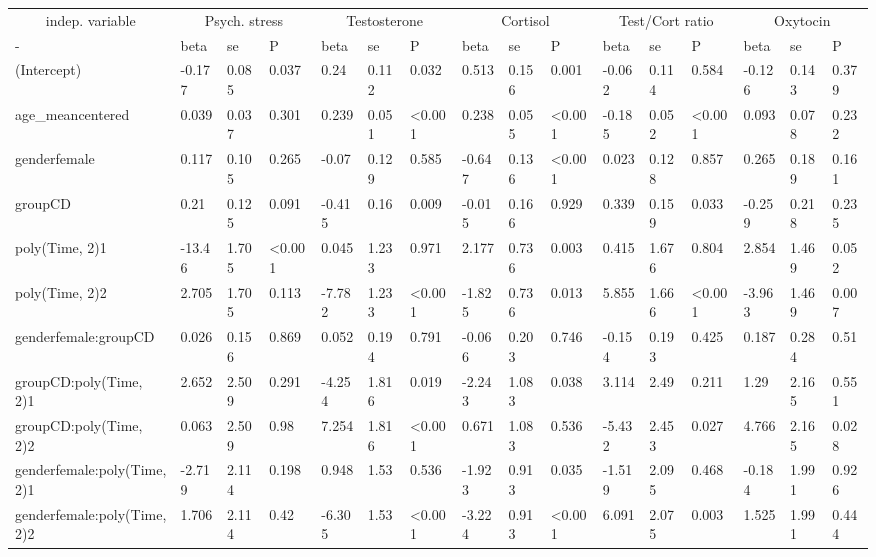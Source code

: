 \documentclass[
]{article}
\begin{document}
\begin{table}
\centering
\begin{tabular}[t]{l|l|l|l|l|l|l|l|l|l|l|l|l|l|l|l}
\hline
\multicolumn{1}{c|}{indep. variable} & \multicolumn{3}{c|}{Psych. stress} & \multicolumn{3}{c|}{Testosterone} & \multicolumn{3}{c|}{Cortisol} & \multicolumn{3}{c|}{Test/Cort ratio} & \multicolumn{3}{c}{Oxytocin} \\
\cline{1-1} \cline{2-4} \cline{5-7} \cline{8-10} \cline{11-13} \cline{14-16}
- & beta & se & P & beta & se & P & beta & se & P & beta & se & P & beta & se & P\\
\hline
(Intercept) & -0.177 & 0.085 & 0.037 & 0.24 & 0.112 & 0.032 & 0.513 & 0.156 & 0.001 & -0.062 & 0.114 & 0.584 & -0.126 & 0.143 & 0.379\\
\hline
age\_meancentered & 0.039 & 0.037 & 0.301 & 0.239 & 0.051 & <0.001 & 0.238 & 0.055 & <0.001 & -0.185 & 0.052 & <0.001 & 0.093 & 0.078 & 0.232\\
\hline
genderfemale & 0.117 & 0.105 & 0.265 & -0.07 & 0.129 & 0.585 & -0.647 & 0.136 & <0.001 & 0.023 & 0.128 & 0.857 & 0.265 & 0.189 & 0.161\\
\hline
groupCD & 0.21 & 0.125 & 0.091 & -0.415 & 0.16 & 0.009 & -0.015 & 0.166 & 0.929 & 0.339 & 0.159 & 0.033 & -0.259 & 0.218 & 0.235\\
\hline
poly(Time, 2)1 & -13.46 & 1.705 & <0.001 & 0.045 & 1.233 & 0.971 & 2.177 & 0.736 & 0.003 & 0.415 & 1.676 & 0.804 & 2.854 & 1.469 & 0.052\\
\hline
poly(Time, 2)2 & 2.705 & 1.705 & 0.113 & -7.782 & 1.233 & <0.001 & -1.825 & 0.736 & 0.013 & 5.855 & 1.666 & <0.001 & -3.963 & 1.469 & 0.007\\
\hline
genderfemale:groupCD & 0.026 & 0.156 & 0.869 & 0.052 & 0.194 & 0.791 & -0.066 & 0.203 & 0.746 & -0.154 & 0.193 & 0.425 & 0.187 & 0.284 & 0.51\\
\hline
groupCD:poly(Time, 2)1 & 2.652 & 2.509 & 0.291 & -4.254 & 1.816 & 0.019 & -2.243 & 1.083 & 0.038 & 3.114 & 2.49 & 0.211 & 1.29 & 2.165 & 0.551\\
\hline
groupCD:poly(Time, 2)2 & 0.063 & 2.509 & 0.98 & 7.254 & 1.816 & <0.001 & 0.671 & 1.083 & 0.536 & -5.432 & 2.453 & 0.027 & 4.766 & 2.165 & 0.028\\
\hline
genderfemale:poly(Time, 2)1 & -2.719 & 2.114 & 0.198 & 0.948 & 1.53 & 0.536 & -1.923 & 0.913 & 0.035 & -1.519 & 2.095 & 0.468 & -0.184 & 1.991 & 0.926\\
\hline
genderfemale:poly(Time, 2)2 & 1.706 & 2.114 & 0.42 & -6.305 & 1.53 & <0.001 & -3.224 & 0.913 & <0.001 & 6.091 & 2.075 & 0.003 & 1.525 & 1.991 & 0.444\\

\end{tabular}
\end{table}
\end{document}
